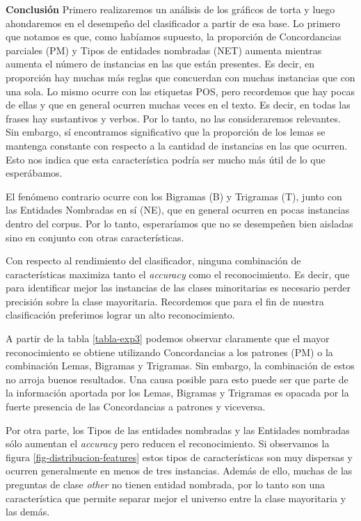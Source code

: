 \textbf{Conclusión} Primero realizaremos un análisis de los gráficos de torta y luego ahondaremos en el desempeño del clasificador a partir de esa base. Lo primero que notamos es que, como habíamos supuesto, la proporción de Concordancias parciales (PM) y Tipos de entidades nombradas (NET) aumenta mientras aumenta el número de instancias en las que están presentes. Es decir, en proporción hay muchas más reglas que concuerdan con muchas instancias que con una sola. Lo mismo ocurre con las etiquetas POS, pero recordemos que hay pocas de ellas y que en general ocurren muchas veces en el texto. Es decir, en todas las frases hay sustantivos y verbos. Por lo tanto, no las consideraremos relevantes. Sin embargo, sí encontramos significativo que la proporción de los lemas se mantenga constante con respecto a la cantidad de instancias en las que ocurren. Esto nos indica que esta característica podría ser mucho más útil de lo que esperábamos.

El fenómeno contrario ocurre con los Bigramas (B) y Trigramas (T), junto con las Entidades Nombradas en sí (NE), que en general ocurren en pocas instancias dentro del corpus. Por lo tanto, esperaríamos que no se desempeñen bien aisladas sino en conjunto con otras características.

Con respecto al rendimiento del clasificador, ninguna combinación de características maximiza tanto el \textit{accuracy} como el reconocimiento. Es decir, que para identificar mejor las instancias de las clases minoritarias es necesario perder precisión sobre la clase mayoritaria. Recordemos que para el fin de nuestra clasificación preferimos lograr un alto reconocimiento.

A partir de la tabla \ref{tabla-exp3} podemos observar claramente que el mayor reconocimiento se obtiene utilizando Concordancias a los patrones (PM) o la combinación Lemas, Bigramas y Trigramas. Sin embargo, la combinación de estos no arroja buenos resultados. Una causa posible para esto puede ser que parte de la información aportada por los Lemas, Bigramas y Trigramas es opacada por la fuerte presencia de las Concordancias a patrones y viceversa.

Por otra parte, los Tipos de las entidades nombradas y las Entidades nombradas sólo aumentan el \textit{accuracy} pero reducen el reconocimiento. Si observamos la figura \ref{fig-distribucion-features} estos tipos de características son muy dispersas y ocurren generalmente en menos de tres instancias. Además de ello, muchas de las preguntas de clase \textit{other} no tienen entidad nombrada, por lo tanto son una característica que permite separar mejor el universo entre la clase mayoritaria y las demás.

